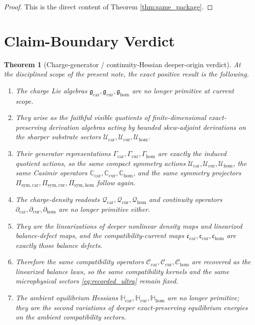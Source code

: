 \documentclass[11pt]{article}
\newcommand{\RootTensorClass}{\mathscr U_{\mathrm{car}}}
\newcommand{\RootRelabelClass}{\mathscr U_{\mathrm{cur}}}
\newcommand{\RootFreeClass}{\mathscr U_{\mathrm{hom}}}
\newcommand{\TensorSymProj}{\Pi_{\mathrm{sym,car}}}
\newcommand{\CurSymProj}{\Pi_{\mathrm{sym,cur}}}
\newcommand{\HomSymProj}{\Pi_{\mathrm{sym,hom}}}
\newcommand{\TensorCompat}{\mathcal C_{\mathrm{car}}}
\newcommand{\CurCompat}{\mathcal C_{\mathrm{cur}}}
\newcommand{\HomCompat}{\mathcal C_{\mathrm{hom}}}
\newcommand{\TensorSymAct}{\mathscr U_{\mathrm{car}}}
\newcommand{\CurSymAct}{\mathscr U_{\mathrm{cur}}}
\newcommand{\HomSymAct}{\mathscr U_{\mathrm{hom}}}
\newcommand{\TensorCurrent}{\mathfrak c_{\mathrm{car}}}
\newcommand{\CurCurrent}{\mathfrak c_{\mathrm{cur}}}
\newcommand{\HomCurrent}{\mathfrak c_{\mathrm{hom}}}
\newcommand{\TensorChargeAlg}{\mathfrak g_{\mathrm{car}}}
\newcommand{\CurChargeAlg}{\mathfrak g_{\mathrm{cur}}}
\newcommand{\HomChargeAlg}{\mathfrak g_{\mathrm{hom}}}
\newcommand{\TensorGen}{\Gamma_{\mathrm{car}}}
\newcommand{\CurGen}{\Gamma_{\mathrm{cur}}}
\newcommand{\HomGen}{\Gamma_{\mathrm{hom}}}
\newcommand{\TensorCasimir}{\mathbb C_{\mathrm{car}}}
\newcommand{\CurCasimir}{\mathbb C_{\mathrm{cur}}}
\newcommand{\HomCasimir}{\mathbb C_{\mathrm{hom}}}
\newcommand{\TensorDensity}{\mathcal Q_{\mathrm{car}}}
\newcommand{\CurDensity}{\mathcal Q_{\mathrm{cur}}}
\newcommand{\HomDensity}{\mathcal Q_{\mathrm{hom}}}
\newcommand{\TensorCont}{\partial_{\mathrm{car}}}
\newcommand{\CurCont}{\partial_{\mathrm{cur}}}
\newcommand{\HomCont}{\partial_{\mathrm{hom}}}
\newcommand{\TensorAmbientHess}{\mathbb H_{\mathrm{car}}}
\newcommand{\CurAmbientHess}{\mathbb H_{\mathrm{cur}}}
\newcommand{\HomAmbientHess}{\mathbb H_{\mathrm{hom}}}
\newtheorem{theorem}{Theorem}
\begin{document}
\begin{proof}
This is the direct content of Theorem \ref{thm:same_package}.
\end{proof}

\section{Claim-Boundary Verdict}

\begin{theorem}[Charge-generator / continuity-Hessian deeper-origin verdict]
\label{thm:verdict}
At the disciplined scope of the present note, the exact positive result is the following.
\begin{enumerate}
    \item The charge Lie algebras \(\TensorChargeAlg,\CurChargeAlg,\HomChargeAlg\) are no longer primitive at current scope.
    \item They arise as the faithful visible quotients of finite-dimensional exact-preserving derivation algebras acting by bounded skew-adjoint derivations on the sharper substrate sectors \(\RootTensorClass,\RootRelabelClass,\RootFreeClass\).
    \item Their generator representations \(\TensorGen,\CurGen,\HomGen\) are exactly the induced quotient actions, so the same compact symmetry actions \(\TensorSymAct,\CurSymAct,\HomSymAct\), the same Casimir operators \(\TensorCasimir,\CurCasimir,\HomCasimir\), and the same symmetry projectors \(\TensorSymProj,\CurSymProj,\HomSymProj\) follow again.
    \item The charge-density readouts \(\TensorDensity,\CurDensity,\HomDensity\) and continuity operators \(\TensorCont,\CurCont,\HomCont\) are no longer primitive either.
    \item They are the linearizations of deeper nonlinear density maps and linearized balance-defect maps, and the compatibility-current maps \(\TensorCurrent,\CurCurrent,\HomCurrent\) are exactly those balance defects.
    \item Therefore the same compatibility operators \(\TensorCompat,\CurCompat,\HomCompat\) are recovered as the linearized balance laws, so the same compatibility kernels and the same microphysical sectors \eqref{eq:recorded_ultra} remain fixed.
    \item The ambient equilibrium Hessians \(\TensorAmbientHess,\CurAmbientHess,\HomAmbientHess\) are no longer primitive; they are the second variations of deeper exact-preserving equilibrium energies on the ambient compatibility sectors.

\end{enumerate}
\end{theorem}
\end{document}
